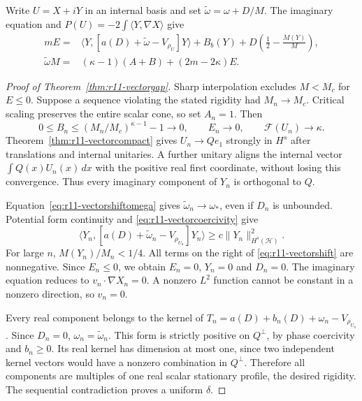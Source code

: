 Write $U=X+iY$ in an internal basis and set
$\widetilde\omega=\omega+D/M$. The imaginary equation and
$P(U)=-2\int\langle Y,\nabla X\rangle$ give
\begin{align}
 mE={}&\langle Y,[a(D)+\widetilde\omega-V_{\rho_U}]Y\rangle
       +B_b(Y)+D\left(\frac12-\frac{M(Y)}M\right),
       \label{eq:r11-vectorshift}\\
 \widetilde\omega M={}&(\kappa-1)(A+B)+(2m-2\kappa)E.
       \label{eq:r11-vectorshiftomega}
\end{align}

\begin{proof}[Proof of Theorem~\ref{thm:r11-vectorgap}]
Sharp interpolation excludes $M<M_c$ for $E\le0$.
Suppose a sequence violating the stated rigidity had $M_n\to M_c$.
Critical scaling preserves the entire scalar cone, so set $A_n=1$.
Then
\[
 0\le B_n\le(M_n/M_c)^{\kappa-1}-1\longrightarrow0,
 \qquad E_n\to0,\qquad\mathcal F(U_n)\to\kappa.
\]
Theorem~\ref{thm:r11-vectorcompact} gives $U_n\to Qe_1$ strongly
in $H^s$ after translations and internal unitaries.
A further unitary aligns the internal vector
$\int Q(x)U_n(x)\,dx$ with the positive real first coordinate,
without losing this convergence. Thus every imaginary component
of $Y_n$ is orthogonal to $Q$.

Equation~\eqref{eq:r11-vectorshiftomega} gives
$\widetilde\omega_n\to\omega_*$, even if $D_n$ is unbounded.
Potential form continuity and \eqref{eq:r11-vectorcoercivity} give
\[
 \langle Y_n,[a(D)+\widetilde\omega_n-V_{\rho_{U_n}}]Y_n\rangle
 \ge c\|Y_n\|_{H^s(\mathcal H)}^2.
\]
For large $n$, $M(Y_n)/M_n<1/4$. All terms on the right of
\eqref{eq:r11-vectorshift} are nonnegative. Since $E_n\le0$,
we obtain $E_n=0$, $Y_n=0$ and $D_n=0$.
The imaginary equation reduces to $v_n\cdot\nabla X_n=0$.
A nonzero $L^2$ function cannot be constant in a nonzero direction,
so $v_n=0$.

Every real component belongs to the kernel of
$T_n=a(D)+b_n(D)+\omega_n-V_{\rho_{U_n}}$.
Since $D_n=0$, $\omega_n=\widetilde\omega_n$. This form is strictly
positive on $Q^\perp$, by phase coercivity and $b_n\ge0$.
Its real kernel has dimension at most one, since two independent
kernel vectors would have a nonzero combination in $Q^\perp$.
Therefore all components are multiples of one real scalar stationary
profile, the desired rigidity. The sequential contradiction proves a
uniform $\delta$.
\end{proof}

